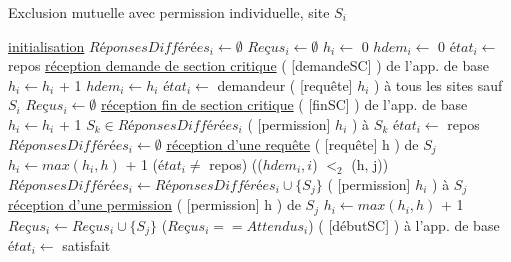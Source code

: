 \documentclass[a4paper,11pt]{article}
\begin{document}
\begin{algorithm}
\DontPrintSemicolon
\SetAlgoVlined
\LinesNumbered

\caption{Exclusion mutuelle avec permission individuelle, site $S_{i}$}

\underline{initialisation} \;
  \Indp
  $RéponsesDifférées_{i} \gets \emptyset $ 
  $Reçus_{i} \gets \emptyset $ 
  $h_{i} \gets$ 0 \;
  $hdem_{i} \gets$ 0 
  $état_{i} \gets$ repos \;
  \Indm
\underline{réception demande de section critique} \;
  \Indp
  \recevoir( [demandeSC] ) de l'app. de base \;
  $h_{i} \gets h_{i}$ + 1 \;
  $hdem_{i} \gets h_{i}$ \;
  $état_{i} \gets$ demandeur \;
  \envoyer( [requête] $h_{i}$ ) à tous les sites sauf $S_{i}$ \;
  $Reçus_{i} \gets \emptyset$ \;
  \Indm
\underline{réception fin de section critique} \;
  \Indp
  \recevoir( [finSC] ) de l'app. de base \;
  $h_{i} \gets h_{i}$ + 1 \;
  \pour \tout $S_{k} \in RéponsesDifférées_{i}$ \faire \;
    \Indp
    \envoyer( [permission] $h_{i}$ ) à $S_{k}$ \;
    \Indm
  \finpour \;
  $état_{i} \gets$ repos \;
  $RéponsesDifférées_{i} \gets \emptyset$ \;
  \Indm
\underline{réception d'une requête} \;
  \Indp
  \recevoir( [requête] h ) de $S_{j}$ \;
  $h_{i} \gets max(h_{i}, h)$ + 1 \;
  \si ($état_{i} \neq $ repos) \et (($hdem_{i}, i$) $<_{2}$ (h, j)) \alors \;
    \Indp
    $RéponsesDifférées_{i} \gets RéponsesDifférées_{i} \cup \{ S_{j} \} $ \;
    \Indm
  \sinon \;
    \Indp
    \envoyer( [permission] $h_{i}$ ) à $S_{j}$ \;
    \Indm
  \finsi \;
  \Indm
\underline{réception d'une permission} \;
  \Indp
  \recevoir( [permission] h ) de $S_{j}$ \;
  $h_{i} \gets max(h_{i}, h)$ + 1 \;
  $Reçus_{i} \gets Reçus_{i} \cup \{ S_{j} \} $ \;
  \si ($Reçus_{i} == Attendus_{i}$) \alors \;
    \Indp
    \envoyer( [débutSC] ) à l'app. de base \;
    $état_{i} \gets$ satisfait \;
    \Indm
  \finsi \;
  \Indm
\end{algorithm}

\end{document}
